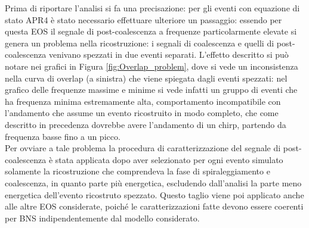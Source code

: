 Prima di riportare l'analisi si fa una precisazione: per gli eventi con equazione di stato APR4 è stato necessario effettuare ulteriore un passaggio: essendo per questa EOS il segnale di post-coalescenza a frequenze particolarmente elevate si genera un problema nella ricostruzione: i segnali di coalescenza e quelli di post-coalescenza venivano spezzati in due eventi separati. L'effetto descritto si può notare nei grafici in Figura \ref{fig:Overlap_problem}, dove si vede un inconsistenza nella curva di overlap (a sinistra) che viene spiegata dagli eventi spezzati: nel grafico delle frequenze massime e minime si vede infatti un gruppo di eventi che ha frequenza minima estremamente alta, comportamento incompatibile con l'andamento che assume un evento ricostruito in modo completo, che come descritto in precedenza dovrebbe avere l'andamento di un chirp, partendo da frequenza basse fino a un picco.\\
Per ovviare a tale problema la procedura di caratterizzazione del segnale di post-coalescenza è stata applicata dopo aver selezionato per ogni evento simulato solamente la ricostruzione che comprendeva la fase di spiraleggiamento e coalescenza, in quanto parte più energetica, escludendo dall'analisi la parte meno energetica dell'evento ricostruto spezzato. Questo taglio viene poi applicato anche alle altre EOS considerate, poiché le caratterizzazioni fatte devono essere coerenti per BNS indipendentemente dal modello considerato.
